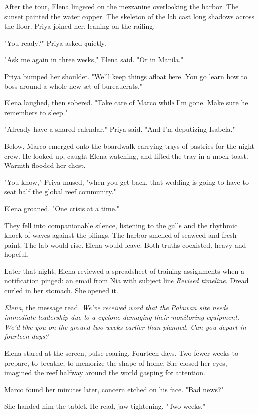 After the tour, Elena lingered on the mezzanine overlooking the harbor. The sunset painted the water copper. The skeleton of the lab cast long shadows across the floor. Priya joined her, leaning on the railing.

"You ready?" Priya asked quietly.

"Ask me again in three weeks," Elena said. "Or in Manila."

Priya bumped her shoulder. "We'll keep things afloat here. You go learn how to boss around a whole new set of bureaucrats."

Elena laughed, then sobered. "Take care of Marco while I'm gone. Make sure he remembers to sleep."

"Already have a shared calendar," Priya said. "And I'm deputizing Isabela."

Below, Marco emerged onto the boardwalk carrying trays of pastries for the night crew. He looked up, caught Elena watching, and lifted the tray in a mock toast. Warmth flooded her chest.

"You know," Priya mused, "when you get back, that wedding is going to have to seat half the global reef community."

Elena groaned. "One crisis at a time."

They fell into companionable silence, listening to the gulls and the rhythmic knock of waves against the pilings. The harbor smelled of seaweed and fresh paint. The lab would rise. Elena would leave. Both truths coexisted, heavy and hopeful.

\bigskip

Later that night, Elena reviewed a spreadsheet of training assignments when a notification pinged: an email from Nia with subject line \textit{Revised timeline}. Dread curled in her stomach. She opened it.

\textit{Elena}, the message read. \textit{We've received word that the Palawan site needs immediate leadership due to a cyclone damaging their monitoring equipment. We'd like you on the ground two weeks earlier than planned. Can you depart in fourteen days?}

Elena stared at the screen, pulse roaring. Fourteen days. Two fewer weeks to prepare, to breathe, to memorize the shape of home. She closed her eyes, imagined the reef halfway around the world gasping for attention.

Marco found her minutes later, concern etched on his face. "Bad news?"

She handed him the tablet. He read, jaw tightening. "Two weeks."

